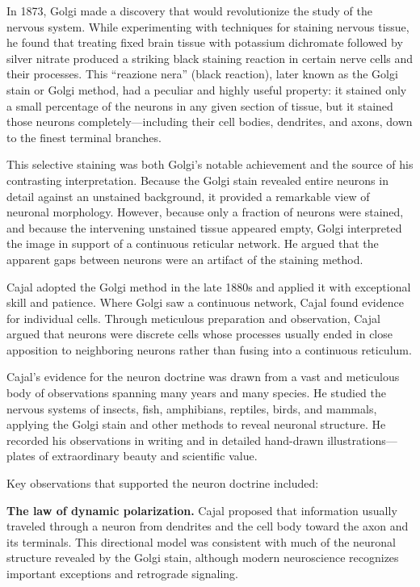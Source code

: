 In 1873, Golgi made a discovery that would revolutionize the study of the nervous system. While experimenting with techniques for staining nervous tissue, he found that treating fixed brain tissue with potassium dichromate followed by silver nitrate produced a striking black staining reaction in certain nerve cells and their processes. This ``reazione nera'' (black reaction), later known as the Golgi stain or Golgi method, had a peculiar and highly useful property: it stained only a small percentage of the neurons in any given section of tissue, but it stained those neurons completely---including their cell bodies, dendrites, and axons, down to the finest terminal branches.

This selective staining was both Golgi's notable achievement and the source of his contrasting interpretation. Because the Golgi stain revealed entire neurons in detail against an unstained background, it provided a remarkable view of neuronal morphology. However, because only a fraction of neurons were stained, and because the intervening unstained tissue appeared empty, Golgi interpreted the image in support of a continuous reticular network. He argued that the apparent gaps between neurons were an artifact of the staining method.\cite{golgi-cajal-history}

Cajal adopted the Golgi method in the late 1880s and applied it with exceptional skill and patience. Where Golgi saw a continuous network, Cajal found evidence for individual cells. Through meticulous preparation and observation, Cajal argued that neurons were discrete cells whose processes usually ended in close apposition to neighboring neurons rather than fusing into a continuous reticulum.\cite{cajal-lecture}

Cajal's evidence for the neuron doctrine was drawn from a vast and meticulous body of observations spanning many years and many species. He studied the nervous systems of insects, fish, amphibians, reptiles, birds, and mammals, applying the Golgi stain and other methods to reveal neuronal structure. He recorded his observations in writing and in detailed hand-drawn illustrations---plates of extraordinary beauty and scientific value.

Key observations that supported the neuron doctrine included:

\textbf{The law of dynamic polarization.} Cajal proposed that information usually traveled through a neuron from dendrites and the cell body toward the axon and its terminals. This directional model was consistent with much of the neuronal structure revealed by the Golgi stain, although modern neuroscience recognizes important exceptions and retrograde signaling.

